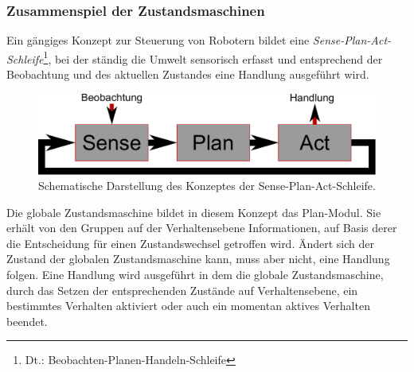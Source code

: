 \subsubsection{Zusammenspiel der Zustandsmaschinen}
\label{integration_umsetzung_zusammenspiel_sec}

Ein gängiges Konzept zur Steuerung von Robotern bildet 
eine \textit{Sense-Plan-Act-Schleife}\footnote{Dt.: Beobachten-Planen-Handeln-Schleife}, bei der 
ständig die Umwelt sensorisch erfasst und entsprechend der Beobachtung und des aktuellen Zustandes 
eine Handlung ausgeführt wird.
\begin{figure}[h]
	\label{fig:integration_sense_plan_act}
	\centering
	\includegraphics[scale=0.5]{graphics/SCHEMA-SensePlanAct.pdf}
	\caption{Schematische Darstellung des Konzeptes der Sense-Plan-Act-Schleife.}
\end{figure}
Die globale Zustandsmaschine bildet in diesem Konzept das Plan-Modul. Sie erhält von den Gruppen auf 
der Verhaltensebene Informationen, auf Basis derer die Entscheidung für einen Zustandswechsel 
getroffen wird. Ändert sich der Zustand der globalen Zustandsmaschine kann, muss aber nicht, eine 
Handlung folgen. Eine Handlung wird ausgeführt in dem die globale Zustandsmaschine, durch das 
Setzen der entsprechenden Zustände auf Verhaltensebene, ein bestimmtes Verhalten aktiviert oder 
auch ein momentan aktives Verhalten beendet.

